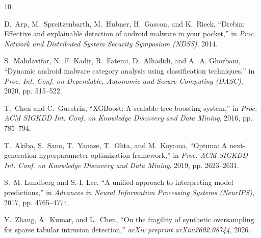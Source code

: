 \documentclass[10pt,journal,compsoc]{IEEEtran}
\begin{document}

\begin{thebibliography}{10}

D.~Arp, M.~Spreitzenbarth, M.~Hubner, H.~Gascon, and K.~Rieck, ``Drebin: Effective and explainable detection of android malware in your pocket,'' in \emph{Proc. Network and Distributed System Security Symposium (NDSS)}, 2014.

S.~Mahdavifar, N.~F. Kadir, R.~Fatemi, D.~Alhadidi, and A.~A. Ghorbani, ``Dynamic android malware category analysis using classification techniques,'' in \emph{Proc. Int. Conf. on Dependable, Autonomic and Secure Computing (DASC)}, 2020, pp. 515--522.

T.~Chen and C.~Guestrin, ``XGBoost: A scalable tree boosting system,'' in \emph{Proc. ACM SIGKDD Int. Conf. on Knowledge Discovery and Data Mining}, 2016, pp. 785--794.

T.~Akiba, S.~Sano, T.~Yanase, T.~Ohta, and M.~Koyama, ``Optuna: A next-generation hyperparameter optimization framework,'' in \emph{Proc. ACM SIGKDD Int. Conf. on Knowledge Discovery and Data Mining}, 2019, pp. 2623--2631.

S.~M. Lundberg and S.-I. Lee, ``A unified approach to interpreting model predictions,'' in \emph{Advances in Neural Information Processing Systems (NeurIPS)}, 2017, pp. 4765--4774.

Y.~Zhang, A.~Kumar, and L.~Chen, ``On the fragility of synthetic oversampling for sparse tabular intrusion detection,'' \emph{arXiv preprint arXiv:2602.08744}, 2026.

\end{thebibliography}
\end{document}
